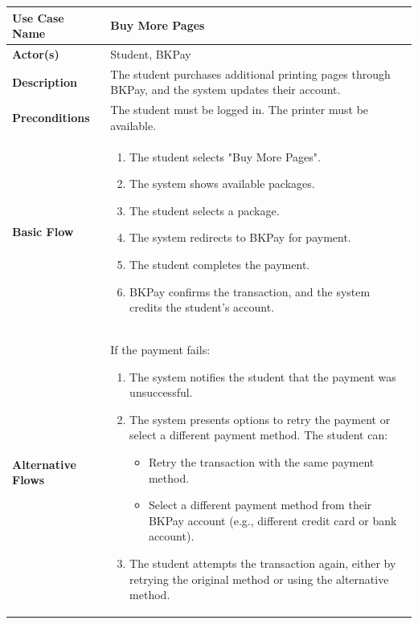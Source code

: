 \begin{enumerate}
        \begin{table}[h!]
            \centering
            \renewcommand{\arraystretch}{1.8}
            \begin{tabular}{|>{\centering\arraybackslash}m{3cm}|>{\raggedright\arraybackslash}m{10cm}|}
            \hline
            \textbf{Use Case Name} & Buy More Pages \\ \hline
            \textbf{Actor(s)} & Student, BKPay \\ \hline
            \textbf{Description} & The student purchases additional printing pages through BKPay, and the system updates their account. \\ \hline
            \textbf{Preconditions} & The student must be logged in. The printer must be available. \\ \hline
            \textbf{Basic Flow} & 
            \begin{enumerate}
                \item The student selects "Buy More Pages".
                \item The system shows available packages.
                \item The student selects a package.
                \item The system redirects to BKPay for payment.
                \item The student completes the payment.
                \item BKPay confirms the transaction, and the system credits the student's account.
            \end{enumerate} \\ \hline
            \textbf{Alternative Flows} & 
            If the payment fails:
            \begin{enumerate}
                \item The system notifies the student that the payment was unsuccessful.
                \item The system presents options to retry the payment or select a different payment method. The student can:
                \begin{itemize}
                    \item Retry the transaction with the same payment method.
                    \item Select a different payment method from their BKPay account (e.g., different credit card or bank account).
                \end{itemize}
                \item The student attempts the transaction again, either by retrying the original method or using the alternative method.

\end{enumerate}
\end{tabular}
\end{table}
\end{enumerate}
